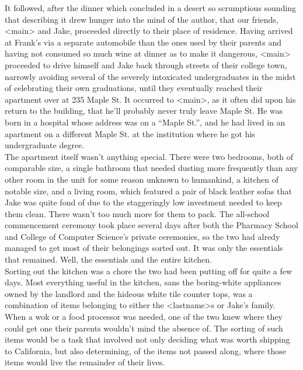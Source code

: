 \documentclass[12pt,openany]{memoir}
\begin{document}
It followed, after the dinner which concluded in a desert so scrumptious sounding that describing it drew hunger into the mind of the author, that our friends, <main> and Jake, proceeded directly to their place of residence.
Having arrived at Frank's via a separate automobile than the ones used by their parents and having not consumed so much wine at dinner as to make it dangerous, <main> proceeded to drive himself and Jake back through streets of their college town, narrowly avoiding several of the severely intoxicated undergraduates in the midst of celebrating their own graduations, until they eventually reached their apartment over at 235 Maple St.
It occurred to <main>, as it often did upon his return to the building, that he'll probably never truly leave Maple St.
He was born in a hospital whose address was on a ``Maple St.'', and he had lived in an apartment on a different Maple St. at the institution where he got his undergraduate degree.
\\

The apartment itself wasn't anything special.
There were two bedrooms, both of comparable size, a single bathroom that needed dusting more frequently than any other room in the unit for some reason unknown to humankind, a kitchen of notable size, and a living room, which featured a pair of black leather sofas that Jake was quite fond of due to the staggeringly low investment needed to keep them clean.
There wasn't too much more for them to pack.
The all-school commencement ceremony took place several days after both the Pharmacy School and College of Computer Science's private ceremonies, so the two had alredy managed to get most of their belongings sorted out.
It was only the essentials that remained.
Well, the essentials and the entire kitchen.
\\

Sorting out the kitchen was a chore the two had been putting off for quite a few days.
Most everything useful in the kitchen, sans the boring-white appliances owned by the landlord and the hideous white tile counter tops, was a combination of items belonging to either the <lastname>s or Jake's family.
When a wok or a food processor was needed, one of the two knew where they could get one their parents wouldn't mind the absence of.
The sorting of such items would be a task that involved not only deciding what was worth shipping to California, but also determining, of the items not passed along, where those items would live the remainder of their lives.
\\
\end{document}
